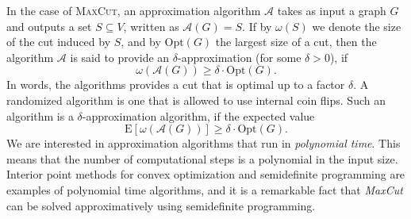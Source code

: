 In the case of \textsc{MaxCut}, an approximation algorithm $\mathcal{A}$ takes as input a graph $G$ and outputs a set $S\subseteq V$, written as $\mathcal{A}(G)=S$. If by $\omega(S)$ we denote the size of the cut induced by $S$, and by $\mathrm{Opt}(G)$ the largest size of a cut, then the algorithm $\mathcal{A}$ is said to provide an $\delta$-approximation (for some $\delta>0$), if
\begin{equation*}
 \omega(\mathcal{A}(G))\geq \delta \cdot \mathrm{Opt}(G).
\end{equation*}
In words, the algorithms provides a cut that is optimal up to a factor $\delta$. A randomized algorithm is one that is allowed to use internal coin flips. Such an algorithm is a $\delta$-approximation algorithm, if the expected value
\begin{equation*}
 \mathrm{E}[\omega(\mathcal{A}(G))] \geq \delta \cdot \mathrm{Opt}(G).
\end{equation*}
We are interested in approximation algorithms that run in {\em polynomial time}. This means that the number of computational steps is a polynomial in the input size. Interior point methods for convex optimization and semidefinite programming are examples of polynomial time algorithms, and it is a remarkable fact that \textit{MaxCut} can be solved approximatively using semidefinite programming.

